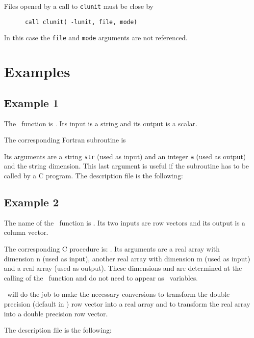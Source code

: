 \documentclass[11pt]{article}
\begin{document}
Files opened by a call to {\tt   clunit} must be close by 
\begin{verbatim}
      call clunit( -lunit, file, mode)
\end{verbatim}
In this case the {\tt file} and  {\tt mode} arguments are not
referenced.

\section{Examples}

\subsection{Example 1}
\label{ex1}

The \SCI\ function is . Its input is a string and its
output is a scalar.

\noindent The corresponding Fortran subroutine is 


\noindent Its arguments are a string {\tt str} (used as input) and an integer
{\tt a} (used as output) and the string dimension. This last argument
is useful if the subroutine has to be called by a C program. The
description file is the following: 




\subsection{Example 2}
\label{ex2}

The name of the \SCI\ function is . Its two inputs are
row vectors and its  output is a column vector.

\noindent The corresponding C procedure is:
. 
\noindent Its arguments
are a real array with dimension n (used as input), another 
real array with  dimension m (used as input) and a real array (used as output).
These dimensions  and  are determined at the calling of the \SCI\
function and do not need to appear as \SCI\ variables.

\ISCI\ will do the job to make the necessary conversions to transform the
double precision (default in \SCI) row vector \T{a} into a real array and to
transform the real array \T{c} into a double precision row vector.

The description file is the following:


\end{document}
